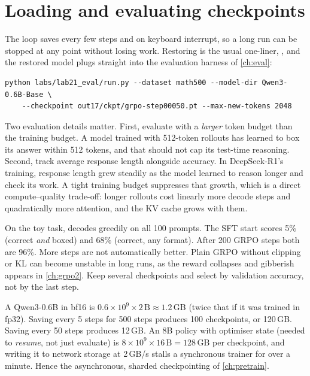 \section{Loading and evaluating checkpoints}\label{sec:grpo:ckpt}

The loop saves  every few steps and on keyboard interrupt, so a
long run can be stopped at any point without losing work. Restoring is the usual one-liner,
, and the restored model plugs straight into
the evaluation harness of \cref{ch:eval}:

\begin{lstlisting}[style=shell,caption={Evaluating an RL checkpoint on MATH-500 with the Chapter 21 harness.},label={lst:grpo:eval}]
python labs/lab21_eval/run.py --dataset math500 --model-dir Qwen3-0.6B-Base \
    --checkpoint out17/ckpt/grpo-step00050.pt --max-new-tokens 2048
\end{lstlisting}

Two evaluation details matter. First, evaluate with a \emph{larger} token budget than the
training budget. A model trained with 512-token rollouts has learned to box its answer
within 512 tokens, and that should not cap its test-time reasoning. Second, track
average response length alongside accuracy. In DeepSeek-R1's training, response length
grew steadily as the model learned to reason longer and check its work. A tight training
budget suppresses that growth, which is a direct compute--quality trade-off: longer
rollouts cost linearly more decode steps and quadratically more attention, and the KV cache
grows with them.

On the toy task,  decodes greedily on all 100 prompts. The SFT
start scores 5\% (correct \emph{and} boxed) and 68\% (correct, any format). After 200 GRPO
steps both are 96\%. More steps are not automatically better. Plain GRPO without clipping
or KL can become unstable in long runs, as the reward collapses and gibberish appears in
\cref{ch:grpo2}. Keep several checkpoints and select by validation accuracy, not by the
last step.

\begin{napkinmath}
A Qwen3-0.6B  in bf16 is $0.6\times10^9\times2\,\text{B}\approx1.2$\,GB
(twice that if it was trained in fp32). Saving every 5 steps for
500 steps produces 100 checkpoints, or 120\,GB. Saving every 50 steps produces 12\,GB. An 8B
policy with optimiser state (needed to \emph{resume}, not just evaluate) is
$8\times10^9\times16\,\text{B}=128$\,GB per checkpoint, and writing it to network storage at
2\,GB/s stalls a synchronous trainer for over a minute. Hence the asynchronous, sharded
checkpointing of \cref{ch:pretrain}.
\end{napkinmath}

